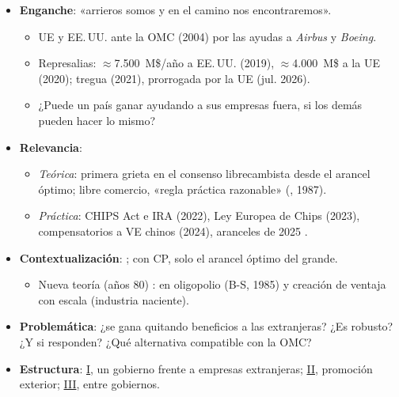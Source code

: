 \documentclass{article}
\begin{document}
\cabecerarepaso
\begin{columnas}

\begin{itemize}
\item \textbf{Enganche}: «arrieros somos y en el camino nos encontraremos».
  \begin{itemize}
  \item UE y EE.\,UU. ante la OMC (2004) por las ayudas a \emph{Airbus} y \emph{Boeing}.
  \item Represalias: $\approx$7.500~M\$/año a EE.\,UU. (2019), $\approx$4.000~M\$ a la UE (2020); tregua (2021), prorrogada por la UE (jul. 2026).
  \item ¿Puede un país ganar ayudando a sus empresas fuera, si los demás pueden hacer lo mismo?
  \end{itemize}
\item \textbf{Relevancia}:
  \begin{itemize}
  \item \emph{Teórica}: primera grieta en el consenso librecambista desde el arancel óptimo; libre comercio, «regla práctica razonable» (, 1987).
  \item \emph{Práctica}: CHIPS Act e IRA (2022), Ley Europea de Chips (2023), compensatorios a VE chinos (2024), aranceles de 2025 .
  \end{itemize}
\item \textbf{Contextualización}:  ; con CP, solo el arancel óptimo del grande.
  \begin{itemize}
  \item Nueva teoría (años 80) :  en oligopolio (B-S, 1985) y creación de ventaja con escala (industria naciente).
  \end{itemize}
\item \textbf{Problemática}: ¿se gana quitando beneficios a las extranjeras? ¿Es robusto? ¿Y si responden? ¿Qué alternativa compatible con la OMC?
\item \textbf{Estructura}: \hyperref[rep:I]{I}, un gobierno frente a empresas extranjeras; \hyperref[rep:II]{II}, promoción exterior; \hyperref[rep:III]{III}, entre gobiernos.
\end{itemize}


\end{columnas}
\end{document}
